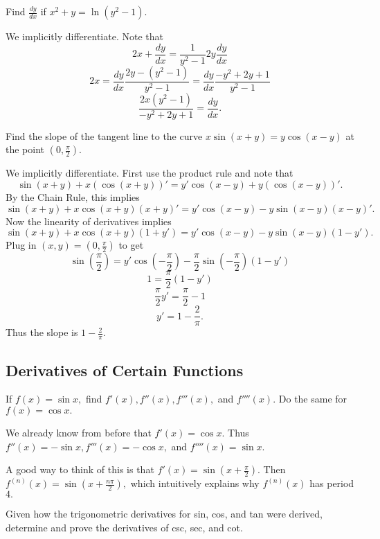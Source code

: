 \documentclass[mast]{lucky}
\begin{document}
\begin{exer}
Find $\frac{dy}{dx}$ if $x^2+y=\ln(y^2-1).$
\end{exer}

\begin{sol}
We implicitly differentiate. Note that
\[2x+\frac{dy}{dx}=\frac{1}{y^2-1}2y\frac{dy}{dx}\]
\[2x=\frac{dy}{dx}\frac{2y-(y^2-1)}{y^2-1}=\frac{dy}{dx}\frac{-y^2+2y+1}{y^2-1}\]
\[\frac{2x(y^2-1)}{-y^2+2y+1}=\frac{dy}{dx}.\]
\end{sol}

\begin{exer}
Find the slope of the tangent line to the curve $x\sin (x+y)=y\cos (x-y)$ at the point $(0,\frac{\pi}{2}).$
\end{exer}

\begin{sol}
We implicitly differentiate. First use the product rule and note that
\[\sin(x+y)+x(\cos(x+y))'=y'\cos(x-y)+y(\cos(x-y))'.\]
By the Chain Rule, this implies
\[\sin(x+y)+x\cos(x+y)(x+y)'=y'\cos(x-y)-y\sin(x-y)(x-y)'.\]
Now the linearity of derivatives implies
\[\sin(x+y)+x\cos(x+y)(1+y')=y'\cos(x-y)-y\sin(x-y)(1-y').\]
Plug in $(x,y)=(0,\frac{\pi}{2})$ to get
\[\sin(\frac{\pi}{2})=y'\cos(-\frac{\pi}{2})-\frac{\pi}{2}\sin(-\frac{\pi}{2})(1-y')\]
\[1=\frac{\pi}{2}(1-y')\]
\[\frac{\pi}{2}y'=\frac{\pi}{2}-1\]
\[y'=1-\frac{2}{\pi}.\]
Thus the slope is $1-\frac{2}{\pi}.$
\end{sol}

\subsection{Derivatives of Certain Functions}

\begin{exer}
If $f(x)=\sin x,$ find $f'(x),f''(x),f'''(x),$ and $f''''(x).$ Do the same for $f(x)=\cos x.$
\end{exer}

\begin{sol}
We already know from before that $f'(x)=\cos x.$ Thus $f''(x)=-\sin x,f'''(x)=-\cos x,$ and $f''''(x)=\sin x.$

A good way to think of this is that $f'(x)=\sin(x+\frac{\pi}{2}).$ Then $f^{(n)}(x)=\sin(x+\frac{n\pi}{2}),$ which intuitively explains why $f^{(n)}(x)$ has period $4.$
\end{sol}

\begin{exer}
Given how the trigonometric derivatives for sin, cos, and tan were derived, determine and prove the derivatives of csc, sec, and cot.
\end{exer}
\end{document}
